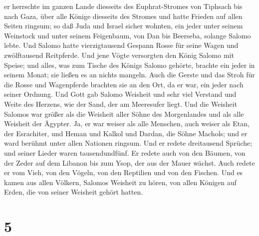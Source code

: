 er herrschte im ganzen Lande diesseits des Euphrat-Stromes von Tiphsach
bis nach Gaza, über alle Könige diesseits des Stromes und hatte Frieden
auf allen Seiten ringsum;  so daß Juda und Israel sicher
wohnten, ein jeder unter seinem Weinstock und unter seinem Feigenbaum,
von Dan bis Beerseba, solange Salomo lebte.  Und Salomo
hatte vierzigtausend Gespann Rosse für seine Wagen und zwölftausend
Reitpferde.  Und jene Vögte versorgten den König Salomo
mit Speise; und alles, was zum Tische des Königs Salomo gehörte, brachte
ein jeder in seinem Monat; sie ließen es an nichts mangeln.
 Auch die Gerste und das Stroh für die Rosse und
Wagenpferde brachten sie an den Ort, da er war, ein jeder nach seiner
Ordnung.  Und Gott gab Salomo Weisheit und sehr viel
Verstand und Weite des Herzens, wie der Sand, der am Meeresufer liegt.
 Und die Weisheit Salomos war größer als die Weisheit
aller Söhne des Morgenlandes und als alle Weisheit der Ägypter.
 Ja, er war weiser als alle Menschen, auch weiser als
Etan, der Esrachiter, und Heman und Kalkol und Dardan, die Söhne
Machols; und er ward berühmt unter allen Nationen ringsum.
 Und er redete dreitausend Sprüche; und seiner Lieder
waren tausendundfünf.  Er redete auch von den Bäumen, von
der Zeder auf dem Libanon bis zum Ysop, der aus der Mauer wächst. Auch
redete er vom Vieh, von den Vögeln, von den Reptilien und von den
Fischen.  Und es kamen aus allen Völkern, Salomos
Weisheit zu hören, von allen Königen auf Erden, die von seiner Weisheit
gehört hatten.

\hypertarget{section-4}{%
\section{5}\label{section-4}}

